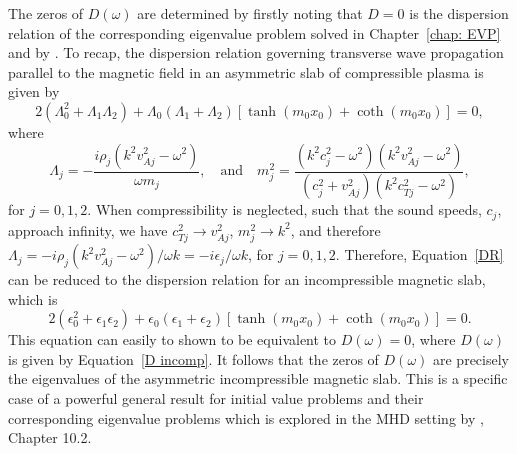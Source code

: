 \documentclass[12pt, draft]{../style-files/ociamthesis}
\begin{document}
The zeros of $D(\omega)$ are determined by firstly noting that $D=0$ is the dispersion relation of the corresponding eigenvalue problem solved in Chapter~\ref{chap: EVP} and by \cite{zsa_etal18}. To recap, the dispersion relation governing transverse wave propagation parallel to the magnetic field in an asymmetric slab of compressible plasma is given by
\begin{equation}
2(\Lambda_0^2 + \Lambda_1 \Lambda_2) + \Lambda_0(\Lambda_1 + \Lambda_2)[\tanh(m_0x_0) + \coth(m_0x_0)] = 0,
\label{DR}
\end{equation}
where
\begin{equation}
\Lambda_j = -\frac{i\rho_j(k^2v_{Aj}^2 - \omega^2)}{\omega m_j},
\quad
\text{and}
\quad
m_j^2 = \frac{(k^2c_j^2 - \omega^2)(k^2v_{Aj}^2 - \omega^2)}{(c_j^2 + v_{Aj}^2)(k^2c_{Tj}^2 - \omega^2)},
\end{equation}
for $j = 0, 1, 2$. When compressibility is neglected, such that the sound speeds, $c_j$, approach infinity, we have $c_{Tj}^2 \to v_{Aj}^2$, $m_j^2 \to k^2$, and therefore $\Lambda_j = -i\rho_j(k^2v_{Aj}^2 - \omega^2)/\omega k = -i\epsilon_j / \omega k$, for $j=0,1,2$. Therefore, Equation~\eqref{DR} can be reduced to the dispersion relation for an incompressible magnetic slab, which is
\begin{equation}
2\left(\epsilon_0^2 + \epsilon_1 \epsilon_2\right) + \epsilon_0(\epsilon_1 + \epsilon_2)[\tanh(m_0x_0) + \coth(m_0x_0)] = 0.
\end{equation}
This equation can easily to shown to be equivalent to $D(\omega) = 0$, where $D(\omega)$ is given by Equation~\eqref{D incomp}. It follows that the zeros of $D(\omega)$ are precisely the eigenvalues of the asymmetric incompressible magnetic slab. This is a specific case of a powerful general result for initial value problems and their corresponding eigenvalue problems which is explored in the MHD setting by \cite{goe_etal04}, Chapter 10.2.
\end{document}
